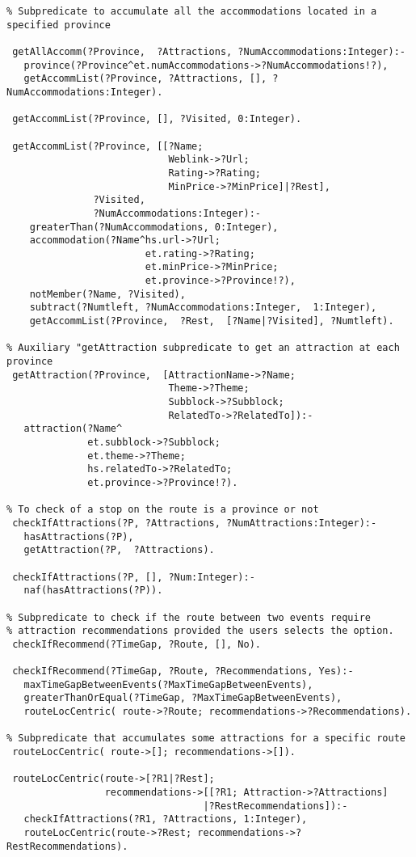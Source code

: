 \begin{verbatim}
% Subpredicate to accumulate all the accommodations located in a specified province

 getAllAccomm(?Province,  ?Attractions, ?NumAccommodations:Integer):-
   province(?Province^et.numAccommodations->?NumAccommodations!?),
   getAccommList(?Province, ?Attractions, [], ?NumAccommodations:Integer).

 getAccommList(?Province, [], ?Visited, 0:Integer).
 
 getAccommList(?Province, [[?Name; 
                            Weblink->?Url; 
                            Rating->?Rating; 
                            MinPrice->?MinPrice]|?Rest],
               ?Visited,  
               ?NumAccommodations:Integer):-
    greaterThan(?NumAccommodations, 0:Integer),
    accommodation(?Name^hs.url->?Url;
	                    et.rating->?Rating;
	                    et.minPrice->?MinPrice;
                        et.province->?Province!?),
    notMember(?Name, ?Visited),
    subtract(?Numtleft, ?NumAccommodations:Integer,  1:Integer),
    getAccommList(?Province,  ?Rest,  [?Name|?Visited], ?Numtleft).  
 
% Auxiliary "getAttraction subpredicate to get an attraction at each province 
 getAttraction(?Province,  [AttractionName->?Name; 
                            Theme->?Theme;  
                            Subblock->?Subblock; 
                            RelatedTo->?RelatedTo]):-
   attraction(?Name^
              et.subblock->?Subblock;
              et.theme->?Theme;
              hs.relatedTo->?RelatedTo;
              et.province->?Province!?).   
   
% To check of a stop on the route is a province or not 
 checkIfAttractions(?P, ?Attractions, ?NumAttractions:Integer):-
   hasAttractions(?P),
   getAttraction(?P,  ?Attractions).

 checkIfAttractions(?P, [], ?Num:Integer):-
   naf(hasAttractions(?P)).     
   
% Subpredicate to check if the route between two events require 
% attraction recommendations provided the users selects the option. 
 checkIfRecommend(?TimeGap, ?Route, [], No).
  
 checkIfRecommend(?TimeGap, ?Route, ?Recommendations, Yes):-
   maxTimeGapBetweenEvents(?MaxTimeGapBetweenEvents),
   greaterThanOrEqual(?TimeGap, ?MaxTimeGapBetweenEvents),
   routeLocCentric( route->?Route; recommendations->?Recommendations).
    
% Subpredicate that accumulates some attractions for a specific route
 routeLocCentric( route->[]; recommendations->[]).

 routeLocCentric(route->[?R1|?Rest];   
                 recommendations->[[?R1; Attraction->?Attractions]
                                  |?RestRecommendations]):-
   checkIfAttractions(?R1, ?Attractions, 1:Integer),
   routeLocCentric(route->?Rest; recommendations->?RestRecommendations).
\end{verbatim}

